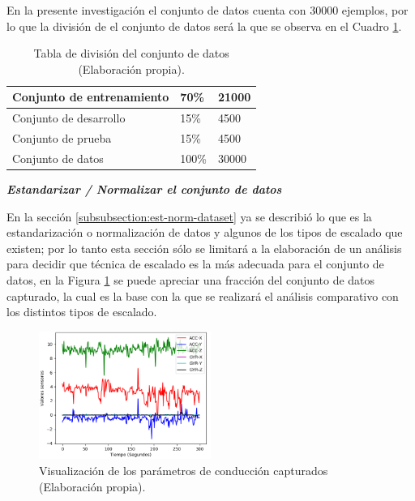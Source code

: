 En la presente investigaci\'{o}n el conjunto de datos cuenta con 30000 ejemplos, por lo que la divisi\'{o}n de el conjunto de datos ser\'{a} la que se observa en el Cuadro \ref{table:division-dataset}.


\begin{table}[]
\centering
\begin{tabular}{|l|l|l|}
\hline
Conjunto de entrenamiento & 70\%  & 21000 \\ \hline
Conjunto de desarrollo    & 15\%  & 4500  \\ \hline
Conjunto de prueba        & 15\%  & 4500  \\ \hline
Conjunto de datos         & 100\% & 30000 \\ \hline
\end{tabular}
\caption{Tabla de divisi\'{o}n del conjunto de datos (Elaboraci\'{o}n propia).}
\label{table:division-dataset}
\end{table}

\vspace{5mm} %

\textbf{\textit{Estandarizar / Normalizar el conjunto de datos}}

\vspace{5mm} %

En la secci\'{o}n \ref{subsubsection:est-norm-dataset} ya se describi\'{o} lo que es la estandarizaci\'{o}n o normalizaci\'{o}n de datos y algunos de los tipos de escalado que existen; por lo tanto esta secci\'{o}n s\'{o}lo se limitar\'{a} a la elaboraci\'{o}n de un an\'{a}lisis para decidir que t\'{e}cnica de escalado es la m\'{a}s adecuada para el conjunto de datos, en la Figura \ref{fig:datos_puros} se puede apreciar una fracci\'{o}n del conjunto de datos capturado, la cual es la base con la que se realizar\'{a} el an\'{a}lisis comparativo con los distintos tipos de escalado.

\begin{figure}[h!]
  \begin{center}	\includegraphics[width=0.5\textwidth,frame]{imagenes/Cap3/datos_sin_preprocesamiento}
  \caption{Visualizaci\'{o}n de los par\'{a}metros de conducci\'{o}n capturados (Elaboraci\'{o}n propia).}
  \label{fig:datos_puros}
  \end{center}
\end{figure}

